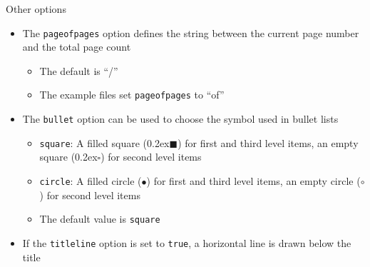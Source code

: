 \begin{frame}[t,fragile]{Other options}
\begin{itemize}
\item The \verb!pageofpages! option defines the string between the current
      page number and the total page count
  \begin{itemize}
  \item The default is ``/''
  \item The example files set \verb!pageofpages! to ``of''
  \end{itemize}
\item The \verb!bullet! option can be used to choose the symbol used in
      bullet lists
  \begin{itemize}
  \item \verb!square!: A filled square
        ({\tiny\raise0.2ex\hbox{$\blacksquare$}}) for
        first and third level items, an empty square
        ({\tiny\raise0.2ex\hbox{$\square$}}) for
        second level items
  \item \verb!circle!: A filled circle ({$\bullet$})
        for first and third level items, an empty circle
        ({$\circ$}) for second level items
  \item The default value is \verb!square!
  \end{itemize}
\item If the \verb!titleline! option is set to \verb!true!, a horizontal line
      is drawn below the title
\end{itemize}
\end{frame}

\begin{frame}
\begin{figure}
 \centering
 
\end{figure}
\end{frame}

\begin{frame}
\begin{figure}
 \centering
 
\end{figure}
\end{frame}

\begin{frame}
\begin{figure}
 \centering
 
\end{figure}
\end{frame}
